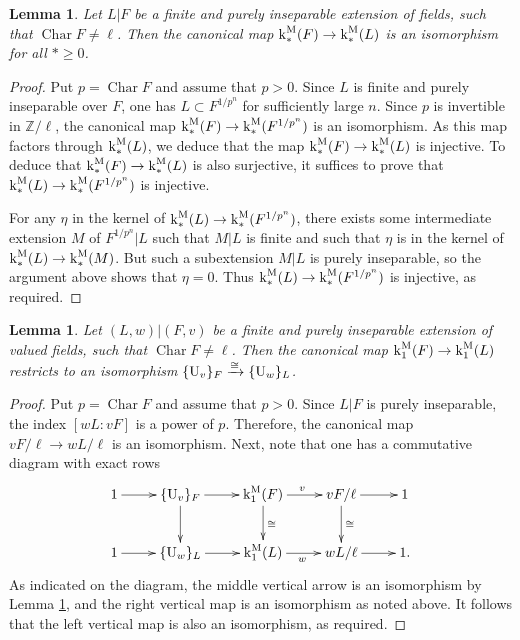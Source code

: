 \documentclass[11pt]{amsart}
\newtheorem{lemma}[proposition]{Lemma}
\theoremstyle{definition}
\theoremstyle{remark}
\numberwithin{equation}{section}
\DeclareMathOperator{\Char}{Char}
\newcommand{\Z}{\mathbb{Z}}
\newcommand{\U}{{\rm U}}
\renewcommand{\k}{\operatorname{k}^{\rm M}}
\begin{document}
\begin{lemma}
\label{lemma: milnor / insep / insep-iso}
  Let $L|F$ be a finite and purely inseparable extension of fields, such that $\Char F \neq \ell$.
  Then the canonical map $\k_*(F) \rightarrow \k_*(L)$ is an isomorphism for all $* \geq 0$.
\end{lemma}
\begin{proof}
  Put $p = \Char F$ and assume that $p > 0$.
  Since $L$ is finite and purely inseparable over $F$, one has $L \subset F^{1/p^n}$ for sufficiently large $n$.
  Since $p$ is invertible in $\Z/\ell$, the canonical map $\k_*(F) \rightarrow \k_*(F^{1/p^n})$ is an isomorphism.
  As this map factors through $\k_*(L)$, we deduce that the map $\k_*(F) \rightarrow \k_*(L)$ is injective.
  To deduce that $\k_*(F) \rightarrow \k_*(L)$ is also surjective, it suffices to prove that $\k_*(L) \rightarrow \k_*(F^{1/p^n})$ is injective.
  
  For any $\eta$ in the kernel of $\k_*(L) \rightarrow \k_*(F^{1/p^n})$, there exists some intermediate extension $M$ of $F^{1/p^n}|L$ such that $M|L$ is finite and such that $\eta$ is in the kernel of $\k_*(L) \rightarrow \k_*(M)$.
  But such a subextension $M|L$ is purely inseparable, so the argument above shows that $\eta = 0$.
  Thus $\k_*(L) \rightarrow \k_*(F^{1/p^n})$ is injective, as required.
\end{proof}

\begin{lemma}
\label{lemma: milnor / insep / insep-val}
  Let $(L,w)|(F,v)$ be a finite and purely inseparable extension of valued fields, such that $\Char F \neq \ell$.
  Then the canonical map $\k_1(F) \rightarrow \k_1(L)$ restricts to an isomorphism $\{\U_v\}_F \xrightarrow{\cong} \{\U_w\}_L$.
\end{lemma}
\begin{proof}
  Put $p = \Char F$ and assume that $p > 0$.
  Since $L|F$ is purely inseparable, the index $[wL:vF]$ is a power of $p$.
  Therefore, the canonical map $vF/\ell \rightarrow wL/\ell$ is an isomorphism.
  Next, note that one has a commutative diagram with exact rows
  \[
  \xymatrix{
  1 \ar[r] & \{\U_v\}_F \ar[d]\ar[r] & \k_1(F) \ar[d]^{\cong}\ar[r]^v & vF/\ell \ar[d]^{\cong}\ar[r] & 1 \\
  1 \ar[r] & \{\U_w\}_L \ar[r] & \k_1(L) \ar[r]_w & wL/\ell \ar[r] & 1.
  }
  \]
  As indicated on the diagram, the middle vertical arrow is an isomorphism by Lemma \ref{lemma: milnor / insep / insep-iso}, and the right vertical map is an isomorphism as noted above.
  It follows that the left vertical map is also an isomorphism, as required.
\end{proof}
\end{document}
